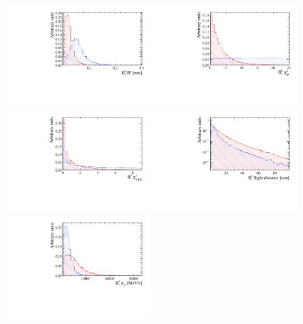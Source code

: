 \begin{figure}[htbp]
  \centering
    \includegraphics[width=0.49\textwidth]{./Figs/Appendix2/B_IP.pdf}
    \includegraphics[width=0.49\textwidth]{./Figs/Appendix2/B_IPCHI2.pdf}
    \includegraphics[width=0.49\textwidth]{./Figs/Appendix2/vertex.pdf}
    \includegraphics[width=0.49\textwidth]{./Figs/Appendix2/FD.pdf}
    \includegraphics[width=0.49\textwidth]{./Figs/Appendix2/B_PT.pdf}

\end{figure}

